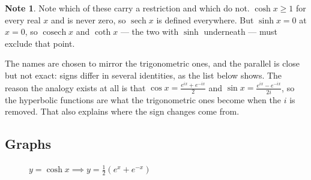 \documentclass[11pt,a4paper]{article}
\theoremstyle{definition}
\newtheorem{note}[thm]{Note}
\begin{document}
\begin{note}
Note which of these carry a restriction and which do not. $\cosh x\geq 1$ for every
real $x$ and is never zero, so $\operatorname{sech}x$ is defined everywhere. But
$\sinh x=0$ at $x=0$, so $\operatorname{cosech}x$ and $\coth x$ --- the two with
$\sinh$ underneath --- must exclude that point.

The names are chosen to mirror the trigonometric ones, and the parallel is close
but not exact: signs differ in several identities, as the list below shows. The
reason the analogy exists at all is that $\cos x=\frac{e^{ix}+e^{-ix}}{2}$ and
$\sin x=\frac{e^{ix}-e^{-ix}}{2i}$, so the hyperbolic functions are what the
trigonometric ones become when the $i$ is removed. That also explains where the
sign changes come from.
\end{note}

\pagebreak
\subsection{Graphs}


\begin{figure}[H]
\centering
$y=\cosh x \implies y=\frac{1}{2}(e^x+e^{-x})$\\
\end{figure}


\vspace{0.7cm}
\begin{figure}[H]
\centering
{}
\end{figure}
\vspace{0.5cm}
\end{document}
